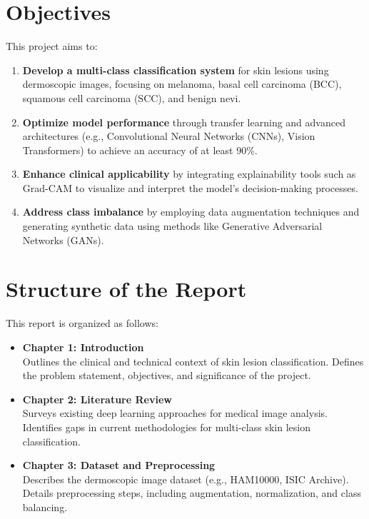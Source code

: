 \documentclass[a4paper,12pt]{report}
\begin{document}
\begin{spacing}{1.5}
    \section{Objectives}
    This project aims to:
    \begin{enumerate}
        \item \textbf{Develop a multi-class classification system} for skin lesions using dermoscopic images, focusing on melanoma, basal cell carcinoma (BCC), squamous cell carcinoma (SCC), and benign nevi.
        \item \textbf{Optimize model performance} through transfer learning and advanced architectures (e.g., Convolutional Neural Networks (CNNs), Vision Transformers) to achieve an accuracy of at least 90\%.
        \item \textbf{Enhance clinical applicability} by integrating explainability tools such as Grad-CAM to visualize and interpret the model's decision-making processes.
        \item \textbf{Address class imbalance} by employing data augmentation techniques and generating synthetic data using methods like Generative Adversarial Networks (GANs).
    \end{enumerate}

    \section{Structure of the Report}
    This report is organized as follows:

    \begin{itemize}
        \item \textbf{Chapter 1: Introduction} \\
        Outlines the clinical and technical context of skin lesion classification. Defines the problem statement, objectives, and significance of the project.

        \item \textbf{Chapter 2: Literature Review} \\
        Surveys existing deep learning approaches for medical image analysis. Identifies gaps in current methodologies for multi-class skin lesion classification.

        \item \textbf{Chapter 3: Dataset and Preprocessing} \\
        Describes the dermoscopic image dataset (e.g., HAM10000, ISIC Archive). Details preprocessing steps, including augmentation, normalization, and class balancing.


\end{itemize}
\end{spacing}
\end{document}
